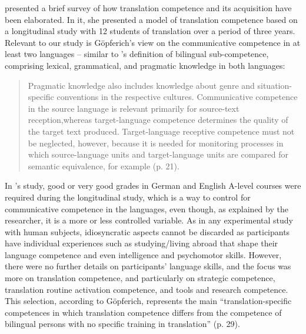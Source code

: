 \documentclass[output=paper]{langscibook}
\begin{document}
\citet{gopferich2009towards} presented a brief survey of how translation competence and its acquisition have been elaborated. In it, she presented a model of translation competence based on a longitudinal study with 12 students of translation over a period of three years. Relevant to our study is Göpferich’s view on the communicative competence in at least two languages -- similar to \citeauthor{beeby2005investigating}’s \citeyear{beeby2005investigating} definition of bilingual sub-competence, comprising lexical, grammatical, and pragmatic knowledge in both languages:

\begin{quote}
Pragmatic knowledge also includes knowledge about genre and situation-spe\-cif\-ic conventions in the respective cultures. Communicative competence in the source language is relevant primarily for source-text reception,\linebreak whereas target-language competence determines the quality of the target text produced. Target-language receptive competence must not be neglect\-ed, however, because it is needed for monitoring processes in which source-lan\-guage units and target-lan\-guage units are compared for semantic equivalence, for example (p. 21).
\end{quote}

In \citeauthor{gopferich2009towards}’s \citeyear{gopferich2009towards} study, good or very good grades in German and English A-level courses were required during the longitudinal study, which is a way to control for communicative competence in the languages, even though, as explained by the researcher, it is a more or less controlled variable. As in any experimental study with human subjects, idiosyncratic aspects cannot be discarded as participants have individual experiences such as studying/living abroad that shape their language competence and even intelligence and psychomotor skills. However, there were no further details on participants’ language skills, and the focus was more on translation competence, and particularly on strategic competence, translation routine activation competence, and tools and research competence. This selection, according to Göpferich, represents the main “translation-specific competences in which translation competence differs from the competence of bilingual persons with no specific training in translation” (p. 29).
\end{document}
